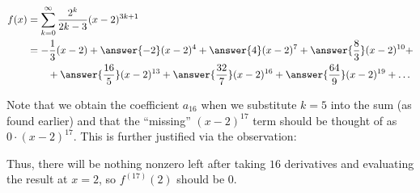 \documentclass{ximera}
\begin{document}
\begin{exercise}
\begin{exercise}
\begin{exercise}
\begin{align*}
f(x) &=\sum_{k=0}^{\infty} \frac{2^k}{2k-3}(x-2)^{3k+1} \\
& = -\frac{1}{3} (x-2) +\answer{-2}(x-2)^4+\answer{4}(x-2)^7+\answer{\frac{8}{3}}(x-2)^{10}+ \\
& \qquad + \answer{\frac{16}{5}}(x-2)^{13}+\answer{\frac{32}{7}}(x-2)^{16}+\answer{\frac{64}{9}}(x-2)^{19}+\ldots \\
\end{align*}

Note that we obtain the coefficient $a_{16}$ when we substitute $k=5$ into the sum (as found earlier) and that the ``missing'' $(x-2)^{17}$ term should be thought of as $0 \cdot (x-2)^{17}$.  This is further justified via the observation:

\begin{image}
  \end{image}

Thus, there will be nothing nonzero left after taking $16$ derivatives and evaluating the result at $x=2$, so $f^{(17)}(2)$ should be $0$.


\end{exercise}
\end{exercise}







\end{exercise}
\end{document}
